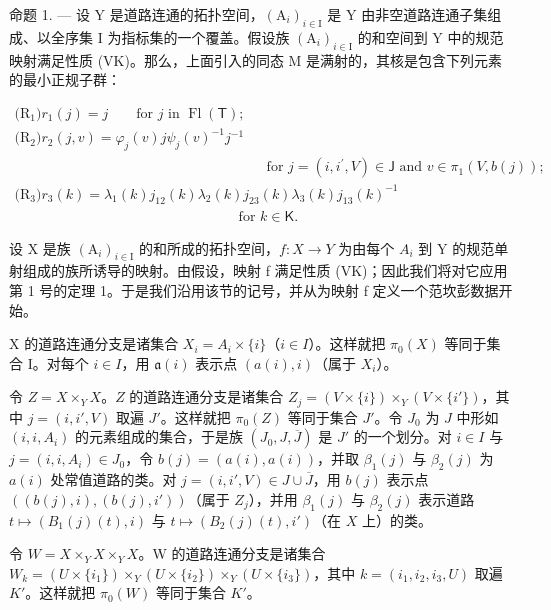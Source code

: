 命题 1. --- 设 Y 是道路连通的拓扑空间，\((\mathrm{A}_{i})_{i\in\mathrm{I}}\) 是 Y 由非空道路连通子集组成、以全序集 I 为指标集的一个覆盖。假设族 \((\mathrm{A}_{i})_{i\in\mathrm{I}}\) 的和空间到 Y 中的规范映射满足性质 (VK)。那么，上面引入的同态 M 是满射的，其核是包含下列元素的最小正规子群：

\[
\begin{array}{l} \text {(R$_ {1}$)} r _ {1} (j) = j \qquad \text {for } j \text { in } \operatorname{Fl}(\mathsf {T}); \\ \text {(R$_ {2}$)} r _ {2} (j, v) = \varphi_ {j} (v) j \psi_ {j} (v) ^ {- 1} j ^ {- 1} \\ \qquad \qquad \qquad \qquad \qquad \qquad \qquad \qquad \qquad \text {for } j = (i,i^{\prime} ,V)\in \mathsf {J} \text { and } v\in\pi_{1} (V,b(j)); \\ \text {(R$_ {3}$)} r _ {3} (k) = \lambda_ {1} (k) j _ {1 2} (k) \lambda_ {2} (k) j _ {2 3} (k) \lambda_ {3} (k) j _ {1 3} (k) ^ {- 1} \\ \qquad \qquad \qquad \qquad \qquad \qquad \qquad \qquad \text {for } k\in \mathsf {K}. \end{array}
\]

设 X 是族 \((\mathrm{A}_{i})_{i\in\mathrm{I}}\) 的和所成的拓扑空间，\(f\colon X\to Y\) 为由每个 \(A_{i}\) 到 Y 的规范单射组成的族所诱导的映射。由假设，映射 f 满足性质 (VK)；因此我们将对它应用第 1 号的定理 1。于是我们沿用该节的记号，并从为映射 f 定义一个范坎彭数据开始。

X 的道路连通分支是诸集合 \(X_{i} = A_{i} \times \{i\}\)（\(i \in I\)）。这样就把 \(\pi_{0}(X)\) 等同于集合 I。对每个 \(i \in I\)，用 \(\mathfrak{a}(i)\) 表示点 \((a(i), i)\)（属于 \(X_{i}\)）。

令 \(Z = X \times_{Y} X\)。\(Z\) 的道路连通分支是诸集合 \(Z_j = (V \times \{i\}) \times_{Y} (V \times \{i'\})\)，其中 \(j = (i, i', V)\) 取遍 \(J'\)。这样就把 \(\pi_0(Z)\) 等同于集合 \(J'\)。令 \(J_0\) 为 \(J\) 中形如 \((i, i, A_i)\) 的元素组成的集合，于是族 \((J_0, J, \overline{J})\) 是 \(J'\) 的一个划分。对 \(i \in I\) 与 \(j = (i, i, A_i) \in J_0\)，令 \(b(j) = (a(i), a(i))\)，并取 \(\beta_1(j)\) 与 \(\beta_2(j)\) 为 \(a(i)\) 处常值道路的类。对 \(j = (i, i', V) \in J \cup \overline{J}\)，用 \(b(j)\) 表示点 \(((b(j), i), (b(j), i'))\)（属于 \(Z_j\)），并用 \(\beta_1(j)\) 与 \(\beta_2(j)\) 表示道路 \(t \mapsto (B_1(j)(t), i)\) 与 \(t \mapsto (B_2(j)(t), i')\)（在 \(X\) 上）的类。

令 \(W = X \times_{Y} X \times_{Y} X\)。W 的道路连通分支是诸集合 \(W_k = (U \times \{i_1\}) \times_{Y} (U \times \{i_2\}) \times_{Y} (U \times \{i_3\})\)，其中 \(k = (i_1, i_2, i_3, U)\) 取遍 \(K'\)。这样就把 \(\pi_0(W)\) 等同于集合 \(K'\)。

